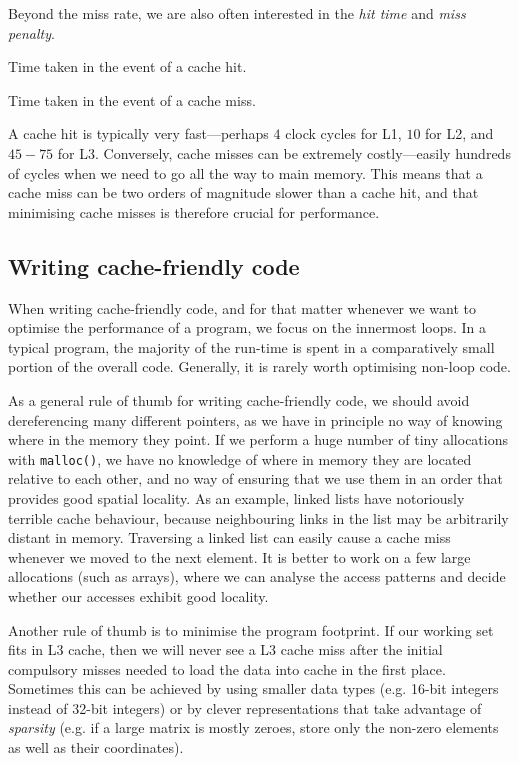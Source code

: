 Beyond the miss rate, we are also often interested in the \emph{hit
  time} and \emph{miss penalty}.
\begin{definition}
  Time taken in the event of a cache hit.
\end{definition}
\begin{definition}
  Time taken in the event of a cache miss.
\end{definition}
A cache hit is typically very fast---perhaps $4$ clock cycles for L1,
$10$ for L2, and $45-75$ for L3.  Conversely, cache misses can be
extremely costly---easily hundreds of cycles when we need to go all
the way to main memory.  This means that a cache miss can be two
orders of magnitude slower than a cache hit, and that minimising cache
misses is therefore crucial for performance.

\subsection{Writing cache-friendly code}

When writing cache-friendly code, and for that matter whenever we want
to optimise the performance of a program, we focus on the innermost
loops.  In a typical program, the majority of the run-time is spent in
a comparatively small portion of the overall code.  Generally, it is
rarely worth optimising non-loop code.

As a general rule of thumb for writing cache-friendly code, we should
avoid dereferencing many different pointers, as we have in principle
no way of knowing where in the memory they point.  If we perform a
huge number of tiny allocations with \texttt{malloc()}, we have no
knowledge of where in memory they are located relative to each other,
and no way of ensuring that we use them in an order that provides good
spatial locality.  As an example, linked lists have notoriously
terrible cache behaviour, because neighbouring links in the list may
be arbitrarily distant in memory.  Traversing a linked list can easily
cause a cache miss whenever we moved to the next element.  It is
better to work on a few large allocations (such as arrays), where we
can analyse the access patterns and decide whether our accesses
exhibit good locality.

Another rule of thumb is to minimise the program footprint.  If our
working set fits in L3 cache, then we will never see a L3 cache miss
after the initial compulsory misses needed to load the data into cache
in the first place.  Sometimes this can be achieved by using smaller
data types (e.g. 16-bit integers instead of 32-bit integers) or by
clever representations that take advantage of \emph{sparsity} (e.g. if
a large matrix is mostly zeroes, store only the non-zero elements as
well as their coordinates).

